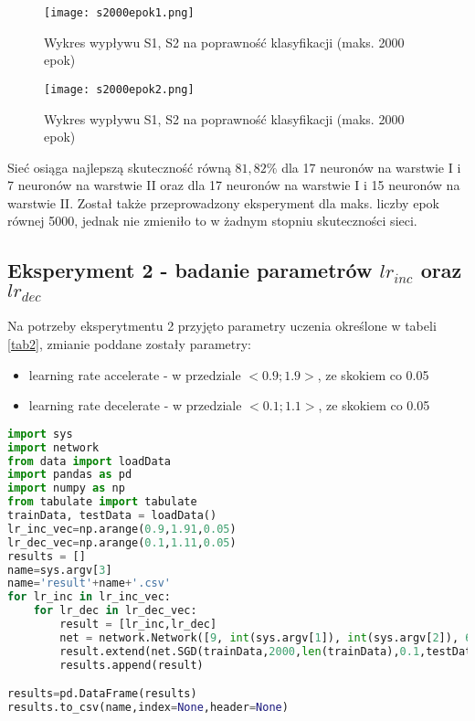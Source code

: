 \documentclass[12pt,twoside]{article}
\begin{document}
\begin{figure}[H]
\label{s2000epok1}
\centering
\texttt{[image: s2000epok1.png]}
\caption{Wykres wypływu S1, S2 na poprawność klasyfikacji (maks. 2000 epok)}
\end{figure}

\begin{figure}[H]
\label{s2000epok2}
\centering
\texttt{[image: s2000epok2.png]}
\caption{Wykres wypływu S1, S2 na poprawność klasyfikacji (maks. 2000 epok)}
\end{figure}

Sieć osiąga najlepszą skuteczność równą $81,82\%$ dla 17 neuronów na warstwie I i 7 neuronów na warstwie II oraz dla 17 neuronów na warstwie I i 15 neuronów na warstwie II. Został także przeprowadzony eksperyment dla maks. liczby epok równej 5000, jednak nie zmieniło to w żadnym stopniu skuteczności sieci.

\subsection{Eksperyment 2 - badanie parametrów $lr_{inc}$ oraz $lr_{dec}$}
Na potrzeby eksperytmentu 2 przyjęto parametry uczenia określone w tabeli \ref{tab2}, zmianie poddane zostały parametry:
\begin{itemize}
\item learning rate accelerate - w przedziale $< 0.9; 1.9 >$, ze skokiem co 0.05
\item learning rate decelerate - w przedziale $< 0.1; 1.1 >$, ze skokiem co 0.05
\end{itemize}


\begin{lstlisting}[language=Python,caption=Algorytm realizujący eksperyment 2,label={eks2}]
import sys
import network
from data import loadData
import pandas as pd
import numpy as np
from tabulate import tabulate
trainData, testData = loadData()
lr_inc_vec=np.arange(0.9,1.91,0.05)
lr_dec_vec=np.arange(0.1,1.11,0.05)
results = []
name=sys.argv[3]
name='result'+name+'.csv'
for lr_inc in lr_inc_vec:
    for lr_dec in lr_dec_vec:
        result = [lr_inc,lr_dec]
        net = network.Network([9, int(sys.argv[1]), int(sys.argv[2]), 6])
        result.extend(net.SGD(trainData,2000,len(trainData),0.1,testData,0.25,lr_inc,lr_dec))
        results.append(result)

results=pd.DataFrame(results)
results.to_csv(name,index=None,header=None)

\end{lstlisting}
\end{document}
